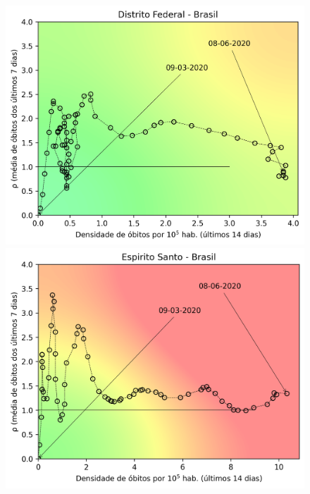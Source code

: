 \documentclass[]{article}
\begin{document}
\begin{figure}[!h]
	\begin{minipage}[t]{4cm}
	\centering
	\includegraphics[scale=0.5]{../DF.png}
\end{minipage}
\hspace{5cm}
\begin{minipage}[t]{4cm}
	\centering
	\includegraphics[scale=0.5]{../ES.png}
	\vspace{0.2cm}
\end{minipage}
\end{figure}

\newpage
\end{document}
